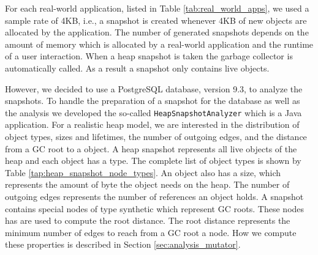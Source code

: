 For each real-world application, listed in Table \ref{tab:real_world_apps}, we used a sample rate of 4KB, i.e., a snapshot is created whenever 4KB of new objects are allocated by the application. The number of generated snapshots depends on the amount of memory which is allocated by a real-world application and the runtime of a user interaction. When a heap snapshot is taken the garbage collector is automatically called. As a result a snapshot only contains live objects. 

However, we decided to use a PostgreSQL \cite{PSQL} database, version 9.3, to analyze the snapshots. To handle the preparation of a snapshot for the database as well as the analysis we developed the so-called \texttt{HeapSnapshotAnalyzer} which is a Java application. For a realistic heap model, we are interested in the distribution of object types, sizes and lifetimes, the number of outgoing edges, and the distance from a GC root to a object. A heap snapshot represents all live objects of the \JS heap and each object has a type. The complete list of object types is shown by Table \ref{tap:heap_snapshot_node_types}. An object also has a size, which represents the amount of byte the object needs on the heap. The number of outgoing edges represents the number of references an object holds. A snapshot contains special nodes of type synthetic which represent GC roots. These nodes has are used to compute the root distance. The root distance represents the minimum number of edges to reach from a GC root a node. How we compute these properties is described in Section \ref{sec:analysis_mutator}.